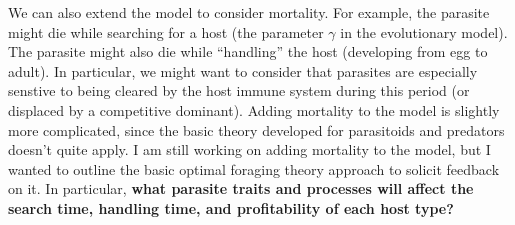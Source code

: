 \documentclass[11pt,reqno,final,pdftex]{amsart}\usepackage[]{graphicx}\usepackage[]{color}
\theoremstyle{plain}
\numberwithin{equation}{part}
\begin{document}
We can also extend the model to consider mortality.
For example, the parasite might die while searching for a host (the parameter $\gamma$ in the evolutionary model).
The parasite might also die while ``handling'' the host (developing from egg to adult).
In particular, we might want to consider that parasites are especially senstive to being cleared by the host immune system during this period (or displaced by a competitive dominant).
Adding mortality to the model is slightly more complicated, since the basic theory developed for parasitoids and predators doesn't quite apply.
I am still working on adding mortality to the model, but I wanted to outline the basic optimal foraging theory approach to solicit feedback on it.
In particular, \textbf{what parasite traits and processes will affect the search time, handling time, and profitability of each host type?}



\end{document}
